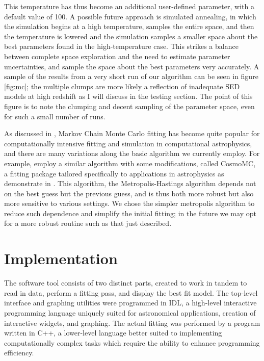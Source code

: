 \documentclass[twocolumn,letterpaper,10pt]{article}
\begin{document}
This temperature has thus become an additional user-defined parameter, with a default value of 100. A possible future approach is simulated annealing, in which the simulation begins at a high temperature, samples the entire space, and then the temperature is lowered and the simulation samples a smaller space about the best parameters found in the high-temperature case. This strikes a balance between complete space exploration and the need to estimate parameter uncertainties, and sample the space about the best parameters very accurately. A sample of the results from a very short run of our algorithm can be seen in figure \ref{fig:mc}; the multiple clumps are more likely a reflection of inadequate SED models at high redshift as I will discuss in the testing section. The point of this figure is to note the clumping and decent sampling of the parameter space, even for such a small number of runs.

As discussed in \citet{dunkley05}, Markov Chain Monte Carlo fitting has become quite popular for computationally intensive fitting and simulation in computational astrophysics, and there are many variations along the basic algorithm we currently employ. For example, \citet{marsden11} employ a similar algorithm with some modifications, called CosmoMC, a fitting package tailored specifically to applications in astrophysics as demonstrate in \citet{CosmoMC}. This algorithm, the Metropolis-Hastings algorithm depends not on the best guess but the previous guess, and is thus both more robust but also more sensitive to various settings. We chose the simpler metropolis algorithm to reduce such dependence and simplify the initial fitting; in the future we may opt for a more robust routine such as that just described.

\section{Implementation}

The software tool consists of two distinct parts, created to work in tandem to read in data, perform a fitting pass, and display the best fit model. The top-level interface and graphing utilities were programmed in IDL, a high-level interactive programming language uniquely suited for astronomical applications, creation of interactive widgets, and graphing. The actual fitting was performed by a program written in C++, a lower-level language better suited to implementing computationally complex tasks which require the ability to enhance programming efficiency.
\end{document}
